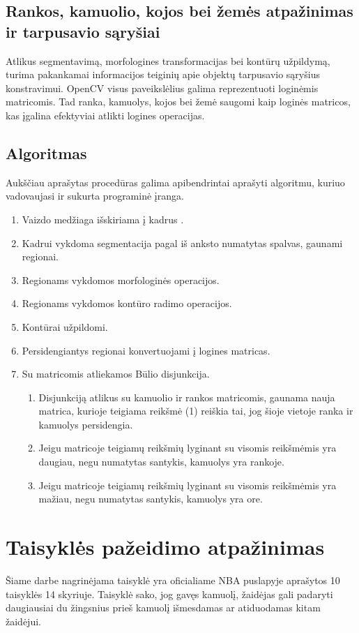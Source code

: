\documentclass{VUMIFPSkursinis}
\begin{document}
\subsection{Rankos, kamuolio, kojos bei žemės atpažinimas ir tarpusavio sąryšiai}
Atlikus segmentavimą, morfologines transformacijas bei kontūrų užpildymą, turima pakankamai informacijos teiginių apie objektų tarpusavio sąryšius konstravimui.
OpenCV visus paveikslėlius galima reprezentuoti loginėmis matricomis. Tad ranka, kamuolys, kojos bei žemė saugomi kaip loginės matricos, kas įgalina efektyviai atlikti logines operacijas.
\subsection{Algoritmas}
Aukščiau aprašytas procedūras galima apibendrintai aprašyti algoritmu, kuriuo vadovaujasi ir sukurta programinė įranga.
\begin{enumerate}
	\item Vaizdo medžiaga išskiriama į kadrus . 
	\item Kadrui vykdoma segmentacija pagal iš anksto numatytas spalvas, gaunami regionai. 
	\item Regionams vykdomos morfologinės operacijos.
	\item Regionams vykdomos kontūro radimo operacijos.
	\item Kontūrai užpildomi.
	\item Persidengiantys regionai konvertuojami į logines matricas.
	\item Su matricomis atliekamos Būlio disjunkcija.
	  \begin{enumerate}
		\item Disjunkciją atlikus su kamuolio ir rankos matricomis, gaunama nauja matrica, kurioje teigiama reikšmė (1) reiškia tai, jog šioje vietoje ranka ir kamuolys persidengia.
		\item Jeigu matricoje teigiamų reikšmių lyginant su visomis reikšmėmis yra daugiau, negu numatytas santykis, kamuolys yra rankoje.
		\item Jeigu matricoje teigiamų reikšmių lyginant su visomis reikšmėmis yra mažiau, negu numatytas santykis, kamuolys yra ore.
	\end{enumerate}
	
\end{enumerate}

\section{Taisyklės pažeidimo atpažinimas}
Šiame darbe nagrinėjama taisyklė yra oficialiame NBA puslapyje aprašytos 10 taisyklės 14 skyriuje. Taisyklė sako, jog gavęs kamuolį, žaidėjas gali padaryti daugiausiai du žingsnius prieš kamuolį išmesdamas ar atiduodamas kitam žaidėjui. 
\end{document}
